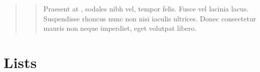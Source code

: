 \documentclass[letterpaper,10pt,english]{sphinxmanual}
\begin{document}
\begin{sphinxVerbatim}[commandchars=\\\{\}]
    
           
       \PYG{p}{[}\PYG{p}{]}
         
      \PYG{p}{[}\PYG{p}{]}  \PYG{p}{[}\PYG{p}{]}
   
\end{sphinxVerbatim}
\begin{quote}
\begin{quote}

Praesent at , sodales nibh vel, tempor felis. Fusce
vel lacinia lacus. Suspendisse rhoncus nunc non nisi iaculis ultrices.
Donec consectetur mauris non neque imperdiet, eget volutpat libero.
\end{quote}
\end{quote}


\section{Lists}
\label{\detokenize{markdown:lists}}
\end{document}
